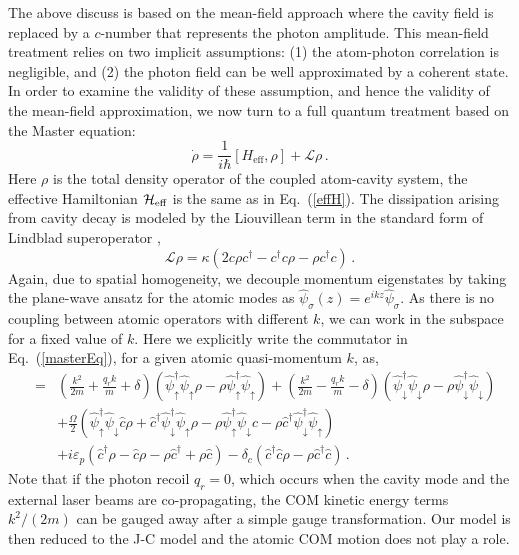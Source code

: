 \documentclass[atoms,article,submit,moreauthors,pdftex,12pt,a4paper]{mdpi}
\def\be{\begin{equation}}
\def\ee{\end{equation}}
\def\ba{\begin{eqnarray}}
\def\ea{\end{eqnarray}}
\begin{document}
The above discuss is based on the mean-field approach where the cavity field is replaced by a $c$-number that represents the photon amplitude. This mean-field treatment relies on two implicit assumptions: (1) the atom-photon correlation is negligible, and (2) the photon field can be well approximated by a coherent state. In order to examine the validity of these assumption, and hence the validity of the mean-field approximation, we now turn to a full quantum treatment based on the Master equation:
\be 
\dot{\rho} = \frac{1}{i\hbar}[H_{\text{eff}},\rho]+\mathcal{L}\rho \,. \label{masterEq}
\ee
Here $\rho$ is the total density operator of the coupled atom-cavity system, the effective Hamiltonian ${\cal H}_{\text{eff}}$ is the same as in Eq.~(\ref{effH}). The dissipation arising from cavity decay is modeled by the Liouvillean term in the 
standard form of Lindblad superoperator \cite{L1, L2},
\be 
\mathcal{L}\rho = \kappa (2c\rho c^\dagger-c^\dagger c\rho-\rho c^\dagger c)\,.\label{Lindblad}
\ee
Again, due to spatial homogeneity, we decouple momentum eigenstates by taking the plane-wave ansatz for the atomic modes as $\hat{\psi}_\sigma({z})=e^{i{k}{z}}\hat{\psi}_\sigma$. As there is no coupling between atomic operators with different $k$, we can work in the subspace for a fixed value of $k$. Here we explicitly write the commutator in Eq.~(\ref{masterEq}), for a given atomic quasi-momentum $k$, as,
\ba
[{\cal H}_{\text{eff}}({k}),\rho] & = & \left(\frac{{ k}^{2}}{2m}+\frac{q_{r}k}{m}+\delta\right)\left(\hat{\psi}_{\uparrow}^{\dagger} \hat{\psi}_{\uparrow}\rho-\rho \hat{\psi}_{\uparrow}^{\dagger} \hat{\psi}_{\uparrow}\right)+\left(\frac{{k}^{2}}{2m}-\frac{q_{r}k}{m}-\delta\right) \left(\hat{\psi}_{\downarrow}^{\dagger} \hat{\psi}_{\downarrow}\rho-\rho \hat{\psi}_{\downarrow}^{\dagger} \hat{\psi}_{\downarrow}\right)\nonumber\\
 &  & + \frac{\Omega}{2}\left(\hat{\psi}_{\uparrow}^{\dagger} \hat{\psi}_{\downarrow} \hat{c} \rho+\hat{c}^{\dagger} \hat{\psi}_{\downarrow}^{\dagger} \hat{\psi}_{\uparrow}\rho-\rho \hat{\psi}_{\uparrow}^{\dagger} \hat{\psi}_{\downarrow}c-\rho \hat{c}^{\dagger} \hat{\psi}_{\downarrow}^{\dagger} \hat{\psi}_{\uparrow}\right)\nonumber\\
&& + i\varepsilon_{p}\left(\hat{c}^{\dagger}\rho-\hat{c}\rho-\rho \hat{c}^{\dagger}+\rho \hat{c}\right)-\delta_{c}\left(\hat{c}^{\dagger}\hat{c}\rho-\rho \hat{c}^{\dagger}\hat{c}\right)\,.
\ea
Note that if the photon recoil $q_r=0$, which occurs when the cavity mode and the external laser beams are co-propagating, the COM kinetic energy terms $k^2/(2m)$ can be gauged away after a simple gauge transformation. Our model is then reduced to the J-C model and the atomic COM motion does not play a role.
\end{document}
